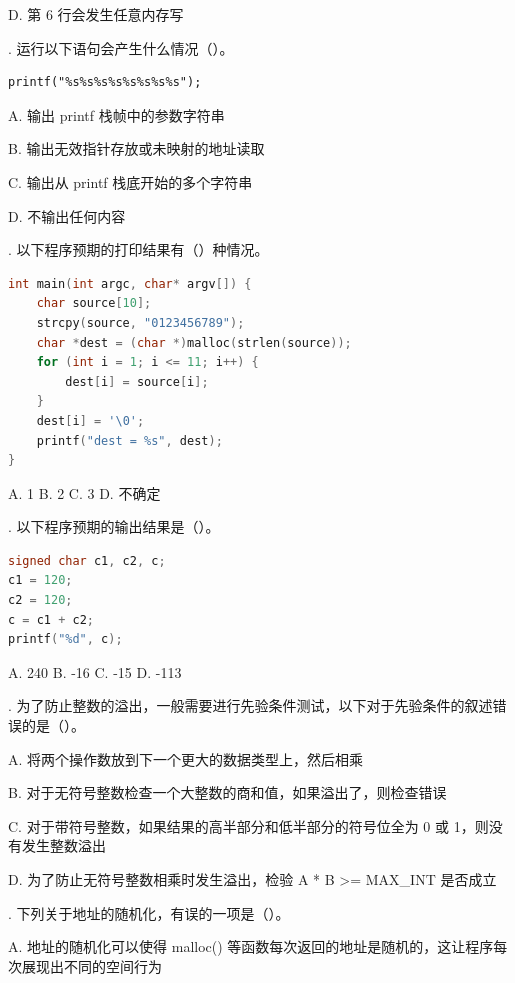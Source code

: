 \documentclass[UTF8]{ctexart}
\begin{document}
\noindent
D. 第 6 行会发生任意内存写

. 运行以下语句会产生什么情况（\quad）。

\begin{lstlisting}
printf("%s%s%s%s%s%s%s%s");
\end{lstlisting}


\noindent
A. 输出 printf 栈帧中的参数字符串

\noindent
B. 输出无效指针存放或未映射的地址读取

\noindent
C. 输出从 printf 栈底开始的多个字符串

\noindent
D. 不输出任何内容

. 以下程序预期的打印结果有（\quad）种情况。

\begin{lstlisting}[language=C]
int main(int argc, char* argv[]) {
    char source[10];
    strcpy(source, "0123456789");
    char *dest = (char *)malloc(strlen(source));
    for (int i = 1; i <= 11; i++) {
        dest[i] = source[i];
    }
    dest[i] = '\0';
    printf("dest = %s", dest);
}
\end{lstlisting}

\noindent
A. 1 \quad
B. 2 \quad
C. 3 \quad
D. 不确定

. 以下程序预期的输出结果是（\quad）。

\begin{lstlisting}[language=C]
signed char c1, c2, c;
c1 = 120;
c2 = 120;
c = c1 + c2;
printf("%d", c);
\end{lstlisting}

\noindent
A. 240 \quad
B. -16 \quad
C. -15 \quad
D. -113

. 为了防止整数的溢出，一般需要进行先验条件测试，以下对于先验条件的叙述错误的是（\quad）。

\noindent
A. 将两个操作数放到下一个更大的数据类型上，然后相乘

\noindent
B. 对于无符号整数检查一个大整数的商和值，如果溢出了，则检查错误

\noindent
C. 对于带符号整数，如果结果的高半部分和低半部分的符号位全为 0 或 1，则没有发生整数溢出

\noindent
D. 为了防止无符号整数相乘时发生溢出，检验 A * B >= MAX\_INT 是否成立

\vspace{0.8em}

. 下列关于地址的随机化，有误的一项是（\quad）。

\noindent
A. 地址的随机化可以使得 malloc() 等函数每次返回的地址是随机的，这让程序每次展现出不同的空间行为
\end{document}

